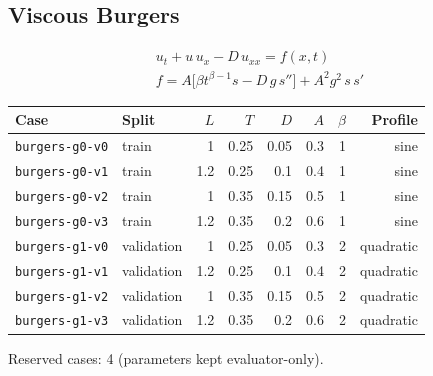 \documentclass[11pt]{article}
\begin{document}
\subsection{Viscous Burgers}
\begin{align*}
u_t + u\,u_x - D\,u_{xx} = f(x,t)\\
f = A\bigl[\beta t^{\beta-1}s - D\,g\,s''\bigr] + A^2 g^2\,s\,s'
\end{align*}
\begin{center}\small
\begin{tabular}{llrrrrrr}
\toprule
Case & Split & $L$ & $T$ & $D$ & $A$ & $\beta$ & Profile \\
\midrule
\texttt{burgers-g0-v0} & train & 1 & 0.25 & 0.05 & 0.3 & 1 & sine \\
\texttt{burgers-g0-v1} & train & 1.2 & 0.25 & 0.1 & 0.4 & 1 & sine \\
\texttt{burgers-g0-v2} & train & 1 & 0.35 & 0.15 & 0.5 & 1 & sine \\
\texttt{burgers-g0-v3} & train & 1.2 & 0.35 & 0.2 & 0.6 & 1 & sine \\
\texttt{burgers-g1-v0} & validation & 1 & 0.25 & 0.05 & 0.3 & 2 & quadratic \\
\texttt{burgers-g1-v1} & validation & 1.2 & 0.25 & 0.1 & 0.4 & 2 & quadratic \\
\texttt{burgers-g1-v2} & validation & 1 & 0.35 & 0.15 & 0.5 & 2 & quadratic \\
\texttt{burgers-g1-v3} & validation & 1.2 & 0.35 & 0.2 & 0.6 & 2 & quadratic \\
\bottomrule
\end{tabular}
\end{center}
\noindent Reserved cases: 4 (parameters kept evaluator-only).
\end{document}
